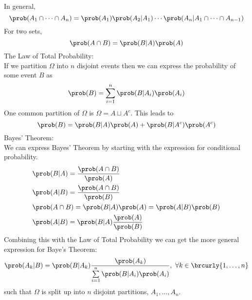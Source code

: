 In general,
\[\prob(A_1\cap\cdots\cap A_n)=\prob(A_1)\prob(A_2|A_1)\cdots\prob(A_n|A_1\cap\cdots\cap A_{n-1})\]
For two sets,
\[\prob(A\cap B)=\prob(B|A)\prob(A)\]
The Law of Total Probability:\\
If we partition $\Omega$ into $n$ disjoint events then we can express the probability of some event $B$ as
\[\prob(B)=\sum_{i=1}^n \prob(B|A_i)\prob(A_i)\]
One common partition of $\Omega$ is $\Omega=A\sqcup A^c$. This leads to
\[\prob(B)=\prob(B|A)\prob(A)+\prob(B|A^c)\prob(A^c)\]
Bayes' Theorem:\\
We can express Bayes' Theorem by starting with the expression for conditional probability.
\begin{align*}
    &\prob(B|A)=\frac{\prob(A\cap B)}{\prob(A)}\\
    &\prob(A|B)=\frac{\prob(A\cap B)}{\prob(B)}\\
    &\prob(A\cap B)=\prob(B|A)\prob(A)=\prob(A|B)\prob(B)\\
    &\prob(A|B)=\prob(B|A)\frac{\prob(A)}{\prob(B)}
\end{align*}
Combining this with the Law of Total Probability we can get the more general expression for Baye's Theorem:
$$\prob(A_k|B)=\prob(B|A_k)\frac{\prob(A_k)}{\sum\limits_{i=1}^n\prob(B|A_i)\prob(A_i)},\ \forall k\in \brcurly{1,\ldots,n}$$
such that $\Omega$ is split up into $n$ disjoint partitions, $A_1,\ldots,A_n$.
